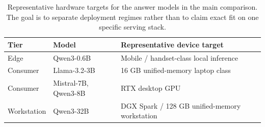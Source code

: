 \begin{table}[t]
\centering
\caption{Representative hardware targets for the answer models in the main comparison. The goal is to separate deployment regimes rather than to claim exact fit on one specific serving stack.}
\label{tab:deployment-tiers-0419}
\small
\setlength{\tabcolsep}{4pt}
\begin{tabular}{@{}lll@{}}
\toprule
\textbf{Tier} & \textbf{Model} & \textbf{Representative device target} \\
\midrule
Edge & Qwen3-0.6B & Mobile / handset-class local inference \\
Consumer & Llama-3.2-3B & 16 GB unified-memory laptop class \\
Consumer & Mistral-7B, Qwen3-8B & RTX desktop GPU \\
Workstation & Qwen3-32B & DGX Spark / 128 GB unified-memory workstation \\
\bottomrule
\end{tabular}
\end{table}
